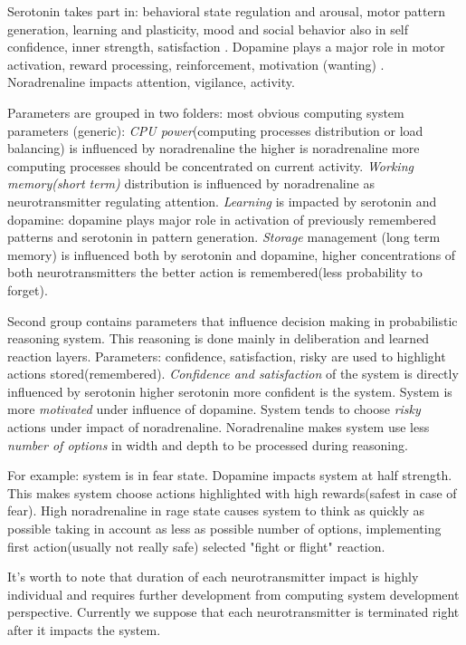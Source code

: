 Serotonin takes part in: behavioral state regulation and arousal, motor pattern generation, learning and plasticity, mood and social behavior \cite{anatomic} also in self confidence, inner strength, satisfaction \cite{cubeofemotions}. Dopamine plays a major role in motor activation, reward processing, reinforcement, motivation (wanting) \cite{cubeofemotions, emotionsbraintorobot, roleofemotions}. Noradrenaline impacts attention, vigilance, activity\cite{cubeofemotions}.

Parameters are grouped in two folders: most obvious computing system parameters (generic):
\emph{CPU power}(computing processes distribution or load balancing) is influenced by noradrenaline the higher is noradrenaline more computing processes should be concentrated on current activity.
\emph{Working memory(short term)} distribution is influenced by noradrenaline as neurotransmitter regulating attention.
\emph{Learning} is impacted by serotonin and dopamine: dopamine plays major role in activation of previously remembered patterns and serotonin in pattern generation.
\emph{Storage} management (long term memory) is influenced both by serotonin and dopamine, higher concentrations of both neurotransmitters the better action is remembered(less probability to forget).

Second group contains parameters that influence decision making in probabilistic reasoning system. This reasoning is done mainly in deliberation and learned reaction layers.
Parameters: confidence, satisfaction, risky are used to highlight actions stored(remembered).
\emph{Confidence and satisfaction} of the system is directly influenced by serotonin higher serotonin more confident is the system.
System is more \emph{motivated} under influence of dopamine.
System tends to choose \emph{risky} actions under impact of noradrenaline.
Noradrenaline makes system use less \emph{number of options} in width and depth to be processed during reasoning.

For example: system is in fear state. Dopamine impacts system at half strength. This makes system choose actions highlighted with high rewards(safest in case of fear). High noradrenaline in rage state causes system to think as quickly as possible taking in account as less as possible number of options, implementing first action(usually not really safe) selected "fight or flight" reaction.

It's worth to note that duration of each neurotransmitter impact is highly individual and requires further development from computing system development perspective. Currently we suppose that each neurotransmitter is terminated right after it impacts the system.

